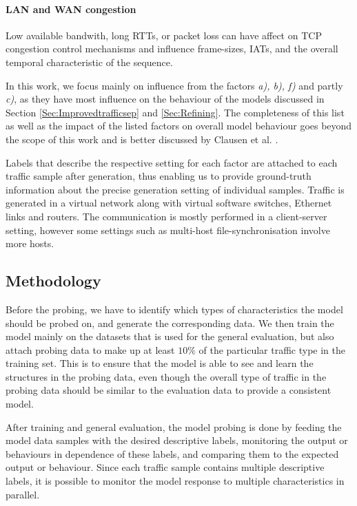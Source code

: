 \documentclass[conference]{IEEEtran}
\begin{document}
\paragraph{LAN and WAN congestion}
Low available bandwith, long RTTs, or packet loss can have affect on TCP congestion control mechanisms and influence frame-sizes, IATs, and the overall temporal characteristic of the sequence.

\vspace{0.2cm}

In this work, we focus mainly on influence from the factors \textit{a), b), f)} and partly \textit{c)}, as they have most influence on the behaviour of the models discussed in Section \ref{Sec:Improvedtrafficsep} and \ref{Sec:Refining}. The completeness of this list as well as the impact of the listed factors on overall model behaviour goes beyond the scope of this work and is better discussed by Clausen et al. \cite{clausen2021Controlling}.


Labels that describe the respective setting for each factor are attached to each traffic sample after generation, thus enabling us to provide ground-truth information about the precise generation setting of individual samples. Traffic is generated in a virtual network along with virtual software switches, Ethernet links and routers. The communication is mostly performed in a client-server setting, however some settings such as multi-host file-synchronisation involve more hosts. 


\subsection{Methodology}

Before the probing, we have to identify which types of characteristics the model should be probed on, and generate the corresponding data. We then train the model mainly on the datasets that is used for the general evaluation, but also attach probing data to make up at least $10\%$ of the particular traffic type in the training set. This is to ensure that the model is able to see and learn the structures in the probing data, even though the overall type of traffic in the probing data should be similar to the evaluation data to provide a consistent model.

After training and general evaluation, the model probing is done by feeding the model data samples with the desired descriptive labels, monitoring the output or behaviours in dependence of these labels, and comparing them to the expected output or behaviour. Since each traffic sample contains multiple descriptive labels, it is possible to monitor the model response to multiple characteristics in parallel.
\end{document}
